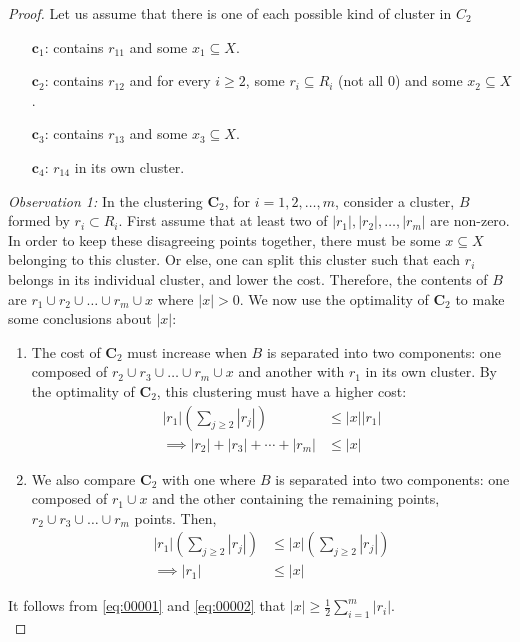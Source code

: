\begin{proof}
Let us assume that there is one of each possible kind of cluster in $C_2$
\begin{enumerate}
    \item[$\mathbf{c}_1$:] contains $r_{11}$ and some $x_1 \subseteq X$.
    \item[$\mathbf{c}_2$:] contains $r_{12}$ and for every $i \ge 2$, some $r_i \subseteq R_i$ (not all $0$) and some $x_2 \subseteq X$.
    \item[$\mathbf{c}_3$:] contains $r_{13}$ and some $x_3 \subseteq X$.
    \item[$\mathbf{c}_4$:] $r_{14}$ in its own cluster.
\end{enumerate}


\textit{Observation 1:} In the clustering $\mathbf{C}_2$, for $i = 1,2,\dots,m$, consider a cluster, $B$ formed by $r_i \subset R_i$. First assume that at least two of $|r_1|, |r_2|, \dots,|r_m|$ are non-zero. In order to keep these disagreeing points together, there must be some $x \subseteq X$ belonging to this cluster. Or else, one can split this cluster such that each $r_i$ belongs in its individual cluster, and lower the cost. Therefore, the contents of $B$ are $r_1 \cup r_2 \cup \dots \cup r_m \cup x$ where $|x| > 0$. We now use the optimality of $\mathbf{C}_2$ to make some conclusions about $|x|$:
\begin{enumerate}
    \item The cost of $\mathbf{C}_2$ must increase when $B$ is separated into two components: one composed of $r_2 \cup r_3 \cup \dots \cup r_m \cup x $ and another with $r_1$ in its own cluster. By the optimality of $\mathbf{C}_2$, this clustering must have a higher cost:
    \begin{align}
        |r_1| \left( \sum_{j \ge 2} |r_j| \right) &\leq |x| |r_1| \nonumber\\
        \implies |r_2| + |r_3| + \cdots + |r_m| &\leq |x| \label{eq:00001}
    \end{align}
    \item We also compare $\mathbf{C}_2$ with one where $B$ is separated into two components: one composed of $r_1 \cup x$ and the other containing the remaining points, $r_2 \cup r_3 \cup \dots \cup r_m$ points. Then, \begin{align}
        |r_1| \left( \sum_{j \ge 2} |r_j| \right) &\le |x| \left( \sum_{j \ge 2} |r_j| \right) \nonumber\\
        \implies |r_1| &\le |x| \label{eq:00002}
    \end{align}
\end{enumerate}
It follows from \eqref{eq:00001} and \eqref{eq:00002} that $|x| \ge \frac12 \sum_{i=1}^{m} |r_i|$.\\


\end{proof}
